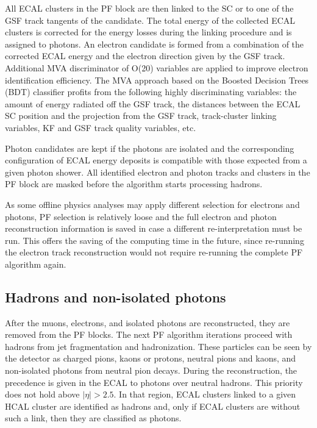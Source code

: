 All ECAL clusters in the PF block are then linked to the SC or to one of the GSF track tangents of the candidate. The total energy of the collected ECAL clusters is corrected for the energy losses during the linking procedure and is assigned to photons. An electron candidate is formed from a combination of the corrected ECAL energy and the electron direction given by the GSF track. Additional MVA discriminator of O(20) variables are applied to improve electron identification efficiency. The MVA approach based on the Boosted Decision Trees (BDT) classifier \cite{TMVA} profits from the following highly discriminating variables: the amount of energy radiated off the GSF track, the distances between the ECAL SC position and the projection from the GSF track, track-cluster linking variables, KF and GSF track quality variables, etc. 

Photon candidates are kept if the photons are isolated and the corresponding configuration of ECAL energy deposits is compatible with those expected from a given photon shower.  All identified electron and photon tracks and clusters in the PF block are masked before the algorithm starts processing hadrons. 

As some offline physics analyses may apply different selection for electrons and photons, PF selection is relatively loose and  the full electron and photon reconstruction information is saved in case a different re-interpretation must be run. This offers the saving of the computing time in the future, since re-running the electron track reconstruction would not require re-running the complete PF algorithm again.

\subsection{Hadrons and non-isolated photons}\label{sec:hadrons}

After the muons, electrons, and isolated photons are reconstructed, they are removed from the PF blocks. The next PF algorithm iterations proceed with hadrons from jet fragmentation and hadronization. These particles can be seen by the detector as charged pions, kaons or protons, neutral pions and kaons, and non-isolated photons from neutral pion decays. During the reconstruction, the precedence is given in the ECAL to photons over neutral hadrons. This priority does not hold above $|\eta| > 2.5$. In that region, ECAL clusters linked to a given HCAL cluster are identified as hadrons and, only if ECAL clusters are without such a link, then they are classified as photons.  

